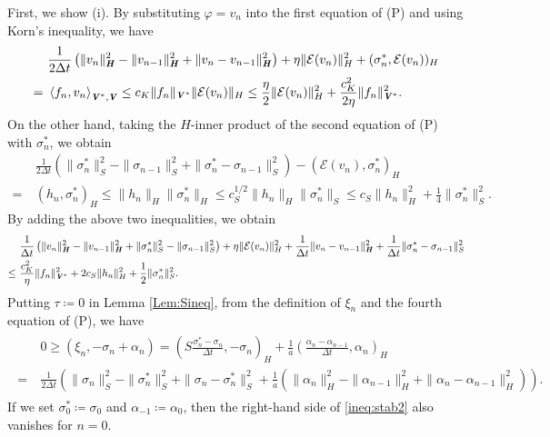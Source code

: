 \documentclass[11pt, a4paper]{article}
\newcommand{\defeq}{\coloneqq}
\newcommand{\dt}{{\Delta t}}
\newcommand{\E}{{\mathcal{E}}}
\newcommand{\bm}[1]{\textbf{\textit{#1}}}%
\newcommand{\Hv}{{\bm{H}}}
\newcommand{\Vv}{{\bm{V}}}
\newcommand{\Hs}{{H}}
\newcommand{\blaket}[2]{ \left\langle {#1},{#2}\right\rangle_{\Vv^*,\Vv} }
\newcommand{\sigmas}[1]{{\sigma_{#1}^*}}
\begin{document}
First, we show (i). By substituting $\varphi=v_n$ into the first equation of (P) and using Korn's inequality, we have
\begin{align*}
	&\frac{1}{2\dt}\left(\|v_n\|_\Hv^2 - \|v_{n-1}\|_\Hv^2
	+ \|v_n - v_{n-1}\|_\Hv^2\right)
	+ \eta \|\E(v_n)\|_\Hs^2 + (\sigmas{n},\E(v_n))_\Hs\\
	=~& \blaket{f_n}{v_n} 
	\le c_K\|f_n\|_{\Vv^*}\|\E(v_n)\|_\Hs
	\le \frac{\eta}{2}\|\E(v_n)\|_\Hs^2 + \frac{c_K^2}{2\eta}\|f_n\|_{\Vv^*}^2.
\end{align*}
On the other hand, taking the $\Hs$-inner product of the second equation of (P) with $\sigmas{n}$, we obtain
\begin{align*}
	&\frac{1}{2\dt}\left(\|\sigmas{n}\|_S^2 - \|\sigma_{n-1}\|_S^2
	+ \|\sigmas{n} - \sigma_{n-1}\|_S^2\right)
	- (\E(v_n),\sigmas{n})_{\Hs}\\
    =~ &(h_n, \sigmas{n})_{\Hs}
    \le \|h_n\|_\Hs \|\sigmas{n}\|_\Hs
    \le c_S^{1/2} \|h_n\|_\Hs \|\sigmas{n}\|_S
	\le c_S \|h_n\|_\Hs^2 + \frac{1}{4}\|\sigmas{n}\|_S^2.
\end{align*}
By adding the above two inequalities, we obtain
\begin{align}\label{ineq:stab1}\begin{aligned}
	&\frac{1}{\dt}\left(\|v_n\|_\Hv^2 - \|v_{n-1}\|_\Hv^2
	+ \|\sigmas{n}\|_S^2 - \|\sigma_{n-1}\|_S^2\right)
    + \eta \|\E(v_n)\|_\Hs^2 
	+ \frac{1}{\dt}\|v_n - v_{n-1}\|_\Hv^2 + \frac{1}{\dt}\|\sigmas{n} - \sigma_{n-1}\|_S^2\\
	\le~& \frac{c_K^2}{\eta}\|f_n\|_{\Vv^*}^2 + 2c_S\|h_n\|_\Hs^2 + \frac{1}{2}\|\sigmas{n}\|_S^2.
\end{aligned}\end{align}
Putting $\tau \defeq 0$ in Lemma \ref{Lem:Sineq}, from the definition of $\xi_n$ and the fourth equation of (P), we have
\begin{align}\label{ineq:stab2}\begin{aligned}
	&0 \ge (\xi_n, -\sigma_n + \alpha_n)
	= \left(S\frac{\sigmas{n}-\sigma_n}{\dt}, - \sigma_n \right)_\Hs
  	+ \frac{1}{a}\left(\frac{\alpha_n - \alpha_{n-1}}{\dt}, \alpha_n \right)_\Hs\\
	=~& \frac{1}{2\dt}\left(\|\sigma_n\|_S^2 - \|\sigmas{n}\|_S^2
	+ \|\sigma_n - \sigmas{n}\|_S^2
	+ \frac{1}{a}\left(\|\alpha_n\|_\Hs^2 - \|\alpha_{n-1}\|_\Hs^2
	+ \|\alpha_n - \alpha_{n-1}\|_\Hs^2\right)\right).
\end{aligned}\end{align}
If we set $\sigmas{0}\defeq\sigma_0$ and $\alpha_{-1}\defeq\alpha_0$, then the right-hand side of \eqref{ineq:stab2} also vanishes for $n=0$.
\end{document}
